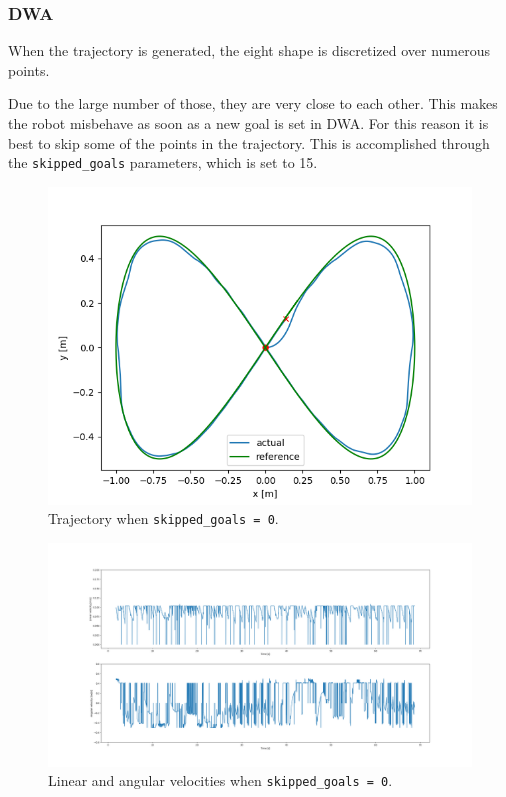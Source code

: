 \documentclass[11pt,a4paper]{article}
\begin{document}
\subsubsection{DWA}

When the trajectory is generated, the eight shape is discretized over numerous points.

Due to the large number of those, they are very close to each other. This makes the robot misbehave as soon as
a new goal is set in DWA. For this reason it is best to skip some of the points in the trajectory.
This is accomplished through the \texttt{skipped\_goals} parameters, which is set to 15.\\

\begin{figure}[H]
    \centering
    \includegraphics[scale=0.4]{different_params/dwa_skippedgoals0/Trajectory.png}
    \caption{Trajectory when \texttt{skipped\_goals = 0}.}
\end{figure}

\begin{figure}[H]
    \centering
    \includegraphics[scale=0.25]{different_params/dwa_skippedgoals0/Linear_and_Angular_Velocities.png}
    \caption{Linear and angular velocities when \texttt{skipped\_goals = 0}.}
\end{figure}
\end{document}
